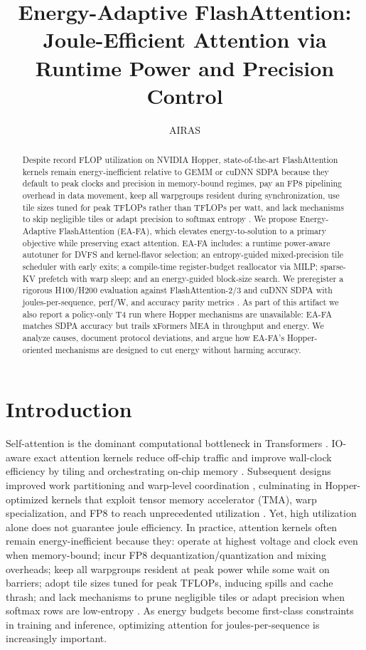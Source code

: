 \documentclass{article}
\title{Energy-Adaptive FlashAttention: Joule-Efficient Attention via Runtime Power and Precision Control}
\author{AIRAS}
\begin{document}
\maketitle

\begin{abstract}
Despite record FLOP utilization on NVIDIA Hopper, state-of-the-art FlashAttention kernels remain energy-inefficient relative to GEMM or cuDNN SDPA because they default to peak clocks and precision in memory-bound regimes, pay an FP8 pipelining overhead in data movement, keep all warpgroups resident during synchronization, use tile sizes tuned for peak TFLOPs rather than TFLOPs per watt, and lack mechanisms to skip negligible tiles or adapt precision to softmax entropy \cite{shah-2024-flashattention}. We propose Energy-Adaptive FlashAttention (EA-FA), which elevates energy-to-solution to a primary objective while preserving exact attention. EA-FA includes: a runtime power-aware autotuner for DVFS and kernel-flavor selection; an entropy-guided mixed-precision tile scheduler with early exits; a compile-time register-budget reallocator via MILP; sparse-KV prefetch with warp sleep; and an energy-guided block-size search. We preregister a rigorous H100/H200 evaluation against FlashAttention-2/3 and cuDNN SDPA with joules-per-sequence, perf/W, and accuracy parity metrics \cite{dao-2022-flashattention,dao-2023-flashattention,shah-2024-flashattention}. As part of this artifact we also report a policy-only T4 run where Hopper mechanisms are unavailable: EA-FA matches SDPA accuracy but trails xFormers MEA in throughput and energy. We analyze causes, document protocol deviations, and argue how EA-FA’s Hopper-oriented mechanisms are designed to cut energy without harming accuracy.
\end{abstract}

\section{Introduction}
Self-attention is the dominant computational bottleneck in Transformers \cite{vaswani-2017-attention}. IO-aware exact attention kernels reduce off-chip traffic and improve wall-clock efficiency by tiling and orchestrating on-chip memory \cite{dao-2022-flashattention}. Subsequent designs improved work partitioning and warp-level coordination \cite{dao-2023-flashattention}, culminating in Hopper-optimized kernels that exploit tensor memory accelerator (TMA), warp specialization, and FP8 to reach unprecedented utilization \cite{shah-2024-flashattention}. Yet, high utilization alone does not guarantee joule efficiency. In practice, attention kernels often remain energy-inefficient because they: operate at highest voltage and clock even when memory-bound; incur FP8 dequantization/quantization and mixing overheads; keep all warpgroups resident at peak power while some wait on barriers; adopt tile sizes tuned for peak TFLOPs, inducing spills and cache thrash; and lack mechanisms to prune negligible tiles or adapt precision when softmax rows are low-entropy \cite{shah-2024-flashattention}. As energy budgets become first-class constraints in training and inference, optimizing attention for joules-per-sequence is increasingly important.
\end{document}
